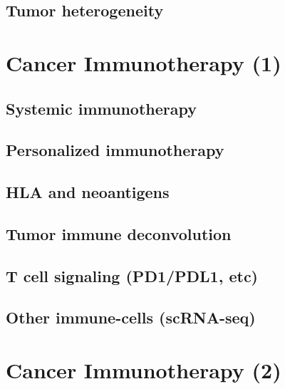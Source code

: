 \documentclass[
]{book}
\begin{document}
\hypertarget{tumor-heterogeneity}{%
\section{Tumor heterogeneity}\label{tumor-heterogeneity}}

\hypertarget{cancerimmuno1}{%
\chapter{Cancer Immunotherapy (1)}\label{cancerimmuno1}}

\hypertarget{systemic-immunotherapy}{%
\section{Systemic immunotherapy}\label{systemic-immunotherapy}}

\hypertarget{personalized-immunotherapy}{%
\section{Personalized immunotherapy}\label{personalized-immunotherapy}}

\hypertarget{hla-and-neoantigens}{%
\section{HLA and neoantigens}\label{hla-and-neoantigens}}

\hypertarget{tumor-immune-deconvolution}{%
\section{Tumor immune deconvolution}\label{tumor-immune-deconvolution}}

\hypertarget{t-cell-signaling-pd1pdl1-etc}{%
\section{T cell signaling (PD1/PDL1, etc)}\label{t-cell-signaling-pd1pdl1-etc}}

\hypertarget{other-immune-cells-scrna-seq}{%
\section{Other immune-cells (scRNA-seq)}\label{other-immune-cells-scrna-seq}}

\hypertarget{cancerimmuno2}{%
\chapter{Cancer Immunotherapy (2)}\label{cancerimmuno2}}
\end{document}
